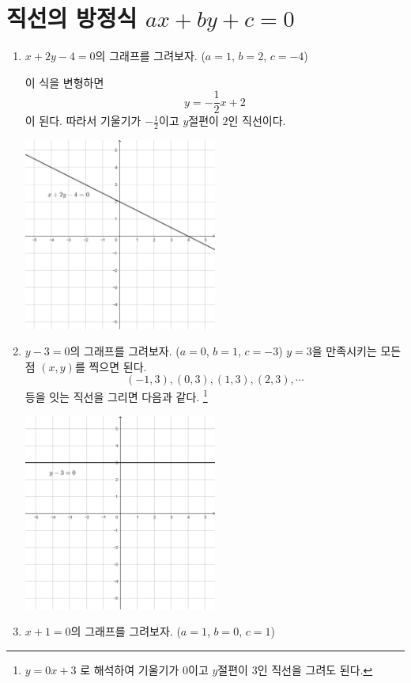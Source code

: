 \documentclass{oblivoir}
\begin{document}
\section{직선의 방정식 \(ax+by+c=0\)}
\exam{}\label{lline1}
\begin{enumerate}
\item
\(x+2y-4=0\)의 그래프를 그려보자.
(\(a=1\), \(b=2\), \(c=-4\))

이 식을 변형하면
\[y=-\frac12x+2\]
이 된다.
따라서 기울기가 \(-\frac12\)이고 \(y\)절편이 \(2\)인 직선이다.
\begin{center}
\includegraphics[width=0.5\textwidth]{line_3}
\end{center}
\item
\(y-3=0\)의 그래프를 그려보자.
(\(a=0\), \(b=1\), \(c=-3\))
\(y=3\)을 만족시키는 모든 점 \((x,y)\)를 찍으면 된다.
\[(-1,3),(0,3),(1,3),(2,3),\cdots\]
등을 잇는 직선을 그리면 다음과 같다.
\footnote{\(y=0x+3\)
로 해석하여 기울기가 \(0\)이고 \(y\)절편이 \(3\)인 직선을 그려도 된다.}
\begin{center}
\includegraphics[width=0.5\textwidth]{line_4}
\end{center}
\item
\(x+1=0\)의 그래프를 그려보자.
(\(a=1\), \(b=0\), \(c=1\))


\end{enumerate}
\end{document}
